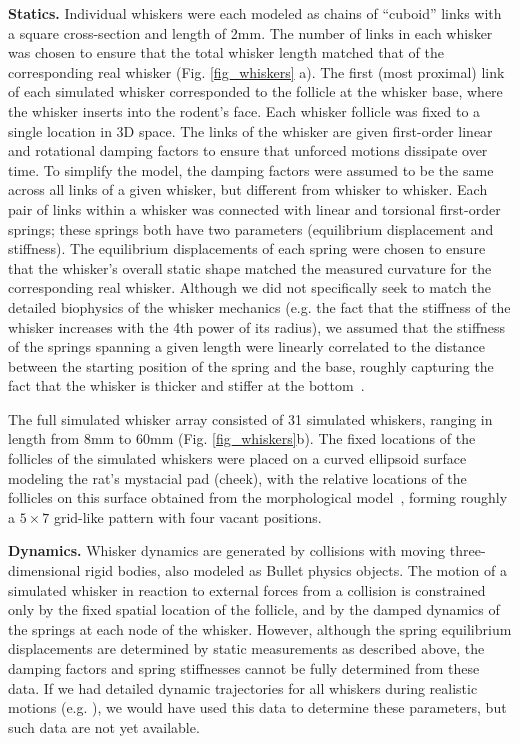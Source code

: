 \textbf{Statics.} Individual whiskers were each modeled as chains of ``cuboid'' links with a square cross-section and length of 2mm.   
The number of links in each whisker was chosen to ensure that the total whisker length matched that of the corresponding real whisker (Fig. \ref{fig_whiskers} a).
The first (most proximal) link of each simulated whisker corresponded to the follicle at the whisker base, where the whisker inserts into the rodent's face. 
Each whisker follicle was fixed to a single location in 3D space.  
The links of the whisker are given first-order linear and rotational damping factors to ensure that unforced motions dissipate over time. 
To simplify the model, the damping factors were assumed to be the same across all links of a given whisker, but different from whisker to whisker.   
Each pair of links within a whisker was connected with linear and torsional first-order springs; these springs both have two parameters (equilibrium displacement and stiffness). 
The equilibrium displacements of each spring were chosen to ensure that the whisker's overall static shape matched the measured curvature for the corresponding real whisker.  
Although we did not specifically seek to match the detailed biophysics of the whisker mechanics (e.g. the fact that the stiffness of the whisker increases with the 4th power of its radius),   
we assumed that the stiffness of the springs spanning a given length were linearly correlated to the distance between the starting position of the spring and the base, roughly capturing the fact that the whisker is thicker and stiffer at the bottom~\cite{Hartmann:2015}.

The full simulated whisker array consisted of 31 simulated whiskers, ranging in length from 8mm to 60mm (Fig. \ref{fig_whiskers}b). 
The fixed locations of the follicles of the simulated whiskers were placed on a curved ellipsoid surface modeling the rat's mystacial pad (cheek), with the relative locations of the follicles on this surface obtained from the morphological model~\cite{Towal2011}, forming roughly a $5\times7$ grid-like pattern with four vacant positions.

\textbf{Dynamics.} Whisker dynamics are generated by collisions with moving three-dimensional rigid bodies, also modeled as Bullet physics objects.  
The motion of a simulated whisker in reaction to external forces from a collision is constrained only by the fixed spatial location of the follicle, and by the damped dynamics of the springs at each node of the whisker. 
However, although the spring equilibrium displacements are determined by static measurements as described above, the damping factors and spring stiffnesses cannot be fully determined from these data.  
If we had detailed dynamic trajectories for all whiskers during realistic motions (e.g. \cite{Quist2014}), we would have used this data to determine these parameters, but such data are not yet available.  

